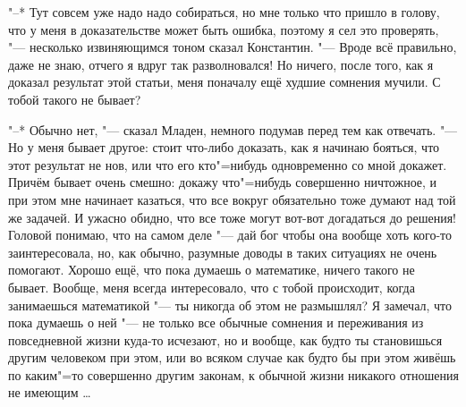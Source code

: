 "--* Тут совсем уже надо надо собираться, но мне только что пришло в голову, что
у меня в доказательстве может быть ошибка, поэтому я сел это проверять, "---
несколько извиняющимся тоном сказал Константин.
"--- Вроде всё правильно, даже не знаю, отчего я вдруг так разволновался!
Но ничего, после того, как я доказал результат этой статьи, меня поначалу ещё
худшие сомнения мучили.
С тобой такого не бывает?

"--* Обычно нет, "--- сказал Младен, немного подумав перед тем как отвечать.
"--- Но у меня бывает другое: стоит что-либо доказать, как я начинаю бояться,
что этот результат не нов, или что его кто"=нибудь одновременно со мной докажет.
Причём бывает очень смешно: докажу что"=нибудь совершенно ничтожное, и при этом
мне начинает казаться, что все вокруг обязательно тоже думают над той же задачей.
И ужасно обидно, что все тоже могут вот-вот догадаться до решения!
Головой понимаю, что на самом деле "--- дай бог чтобы она вообще хоть кого-то
заинтересовала, но, как обычно, разумные доводы в таких ситуациях не очень
помогают.
Хорошо ещё, что пока думаешь о математике, ничего такого не бывает.
Вообще, меня всегда интересовало, что с тобой происходит, когда занимаешься
математикой "--- ты никогда об этом не размышлял?
Я замечал, что пока думаешь о ней "--- не только все обычные сомнения и
переживания из повседневной жизни куда-то исчезают, но и вообще, как будто ты
становишься другим человеком при этом, или во всяком случае как будто бы при
этом живёшь по каким"=то совершенно другим законам, к обычной жизни никакого
отношения не имеющим \ldots

